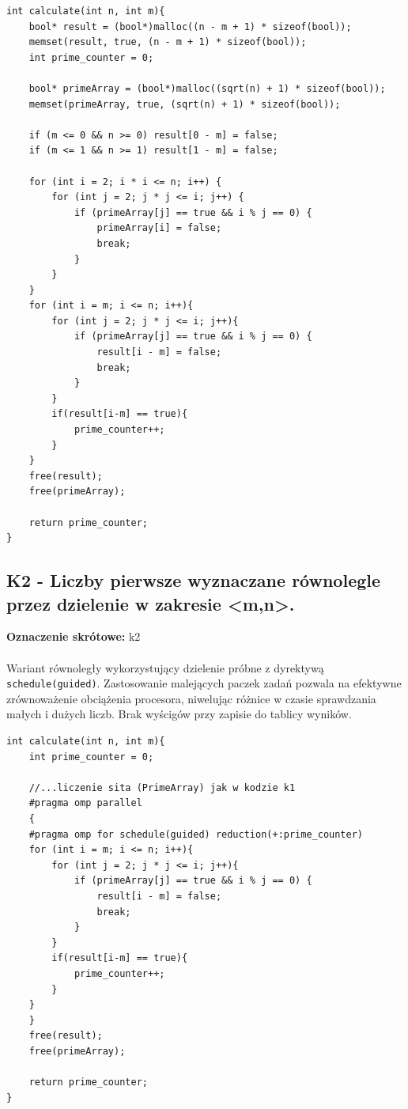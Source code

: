 \documentclass[10pt]{article}
\begin{document}
\begin{lstlisting}[style=mystyle, caption={Kod programu k1.cpp}, label={lst:k1}]
int calculate(int n, int m){
	bool* result = (bool*)malloc((n - m + 1) * sizeof(bool));
	memset(result, true, (n - m + 1) * sizeof(bool));
	int prime_counter = 0;

	bool* primeArray = (bool*)malloc((sqrt(n) + 1) * sizeof(bool));
	memset(primeArray, true, (sqrt(n) + 1) * sizeof(bool));
	
	if (m <= 0 && n >= 0) result[0 - m] = false;
	if (m <= 1 && n >= 1) result[1 - m] = false;

	for (int i = 2; i * i <= n; i++) {
		for (int j = 2; j * j <= i; j++) {
			if (primeArray[j] == true && i % j == 0) { 
				primeArray[i] = false; 
				break;
			}
		}
	}
	for (int i = m; i <= n; i++){
		for (int j = 2; j * j <= i; j++){
			if (primeArray[j] == true && i % j == 0) {
				result[i - m] = false;
				break; 
			} 
		}
		if(result[i-m] == true){
			prime_counter++;
		}
	}
	free(result);
	free(primeArray);

	return prime_counter;
}
\end{lstlisting}

\newpage

\subsection*{K2 - Liczby pierwsze wyznaczane równolegle przez dzielenie w zakresie <m,n>.}
\textbf{Oznaczenie skrótowe:} k2
\\ \\
Wariant równoległy wykorzystujący dzielenie próbne z dyrektywą \texttt{schedule(guided)}. Zastosowanie malejących paczek zadań pozwala na 
efektywne zrównoważenie obciążenia procesora, niwelując różnice w czasie sprawdzania małych i dużych liczb. Brak wyścigów przy zapisie do tablicy wyników.
\\
\begin{lstlisting}[style=mystyle, caption={Kod programu k2.cpp}, label={lst:k2}]
int calculate(int n, int m){
	int prime_counter = 0;

	//...liczenie sita (PrimeArray) jak w kodzie k1
	#pragma omp parallel
	{
	#pragma omp for schedule(guided) reduction(+:prime_counter)
	for (int i = m; i <= n; i++){
		for (int j = 2; j * j <= i; j++){
			if (primeArray[j] == true && i % j == 0) { 
				result[i - m] = false;
				break;
			}
		}	
		if(result[i-m] == true){
			prime_counter++;
		}
	}
	} 
	free(result);
	free(primeArray);
	
	return prime_counter;
}
\end{lstlisting}
\end{document}
